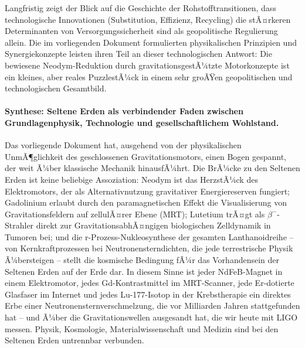 ﻿\documentclass[12pt, a4paper]{report}
\theoremstyle{definition}
\theoremstyle{remark}
\begin{document}
\noindent Langfristig zeigt der Blick auf die Geschichte der Rohstofftransitionen,
dass technologische Innovationen (Substitution, Effizienz, Recycling) die
stÃ¤rkeren Determinanten von Versorgungssicherheit sind als geopolitische
Regulierung allein. Die im vorliegenden Dokument formulierten physikalischen
Prinzipien und Synergiekonzepte leisten ihren Teil an dieser technologischen
Antwort: Die bewiesene Neodym-Reduktion durch gravitationsgestÃ¼tzte Motorkonzepte
ist ein kleines, aber reales PuzzlestÃ¼ck in einem sehr groÃŸen geopolitischen
und technologischen Gesamtbild.

\paragraph{Synthese: Seltene Erden als verbindender Faden zwischen
Grundlagenphysik, Technologie und gesellschaftlichem Wohlstand.}
Das vorliegende Dokument hat, ausgehend von der physikalischen UnmÃ¶glichkeit
des geschlossenen Gravitationsmotors, einen Bogen gespannt, der weit Ã¼ber
klassische Mechanik hinausfÃ¼hrt. Die BrÃ¼cke zu den Seltenen Erden ist keine
beliebige Assoziation: Neodym ist das HerzstÃ¼ck des Elektromotors, der als
Alternativnutzung gravitativer Energiereserven fungiert; Gadolinium erlaubt
durch den paramagnetischen Effekt die Visualisierung von Gravitationsfeldern
auf zellulÃ¤rer Ebene (MRT); Lutetium trÃ¤gt als $\beta^-$-Strahler direkt zur
GravitationsabhÃ¤ngigen biologischen Zelldynamik in Tumoren bei; und die
r-Prozess-Nukleosynthese der gesamten Lanthanoidreihe -- von Kernkraftprozessen
bei Neutronensterndichten, die jede terrestrische Physik Ã¼bersteigen --
stellt die kosmische Bedingung fÃ¼r das Vorhandensein der Seltenen Erden auf der
Erde dar. In diesem Sinne ist jeder NdFeB-Magnet in einem Elektromotor, jedes
Gd-Kontrastmittel im MRT-Scanner, jede Er-dotierte Glasfaser im Internet
und jedes Lu-177-Isotop in der Krebstherapie ein direktes Erbe einer
Neutronensternverschmelzung, die vor Milliarden Jahren stattgefunden hat --
und Ã¼ber die Gravitationswellen ausgesandt hat, die wir heute mit LIGO messen.
Physik, Kosmologie, Materialwissenschaft und Medizin sind bei den Seltenen
Erden untrennbar verbunden.
\end{document}
